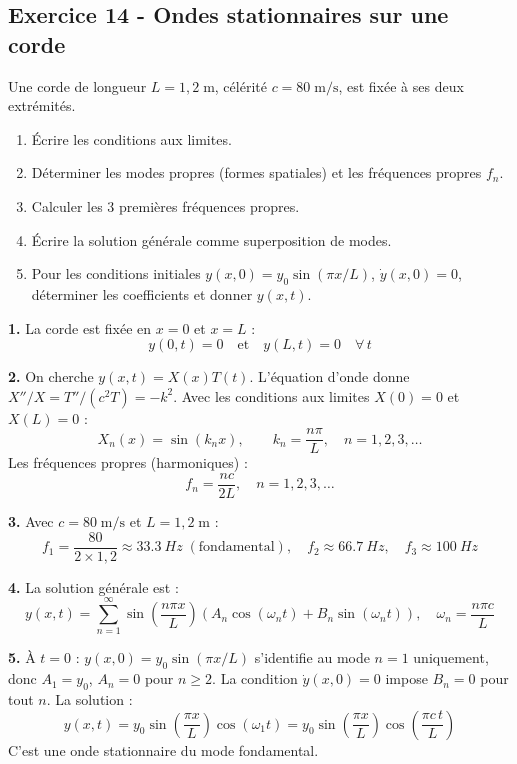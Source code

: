 \documentclass[12pt,a4paper]{article}
\begin{document}
\subsection*{Exercice 14 - Ondes stationnaires sur une corde \niveau{\moyen}}

\begin{boiteexercice}
Une corde de longueur $L=1{,}2\;\text{m}$, célérité $c=80\;\text{m/s}$, est fixée à ses deux extrémités.
\begin{enumerate}
  \item Écrire les conditions aux limites.
  \item Déterminer les modes propres (formes spatiales) et les fréquences propres $f_n$.
  \item Calculer les 3 premières fréquences propres.
  \item Écrire la solution générale comme superposition de modes.
  \item Pour les conditions initiales $y(x,0) = y_0\sin(\pi x/L)$, $\dot y(x,0)=0$, déterminer les coefficients et donner $y(x,t)$.
\end{enumerate}
\end{boiteexercice}

\begin{boitecorrige}
\textbf{1.} La corde est fixée en $x=0$ et $x=L$ :
\[
y(0,t) = 0 \quad \text{et} \quad y(L,t) = 0 \quad \forall\, t
\]

\textbf{2.} On cherche $y(x,t)=X(x)T(t)$. L'équation d'onde donne $X''/X = T''/(c^2 T) = -k^2$. Avec les conditions aux limites $X(0)=0$ et $X(L)=0$ :
\[
X_n(x) = \sin(k_n x), \qquad k_n = \frac{n\pi}{L}, \quad n=1,2,3,\ldots
\]
Les fréquences propres (harmoniques) :
\[
\boxed{f_n = \frac{nc}{2L}}, \quad n=1,2,3,\ldots
\]

\textbf{3.} Avec $c=80\;\text{m/s}$ et $L=1{,}2\;\text{m}$ :
\[
f_1 = \frac{80}{2\times1{,}2} \approx \qty{33.3}{Hz}\;(\text{fondamental}), \quad f_2 \approx \qty{66.7}{Hz}, \quad f_3 \approx \qty{100}{Hz}
\]

\textbf{4.} La solution générale est :
\[
y(x,t) = \sum_{n=1}^{\infty}\sin\!\left(\frac{n\pi x}{L}\right)\!\left(A_n\cos(\omega_n t) + B_n\sin(\omega_n t)\right), \quad \omega_n = \frac{n\pi c}{L}
\]

\textbf{5.} À $t=0$ : $y(x,0)=y_0\sin(\pi x/L)$ s'identifie au mode $n=1$ uniquement, donc $A_1=y_0$, $A_n=0$ pour $n\geq2$. La condition $\dot y(x,0)=0$ impose $B_n=0$ pour tout $n$. La solution :
\[
y(x,t) = y_0\sin\!\left(\frac{\pi x}{L}\right)\cos(\omega_1 t) = y_0\sin\!\left(\frac{\pi x}{L}\right)\cos\!\left(\frac{\pi c\,t}{L}\right)
\]
C'est une onde stationnaire du mode fondamental.
\end{boitecorrige}
\end{document}
